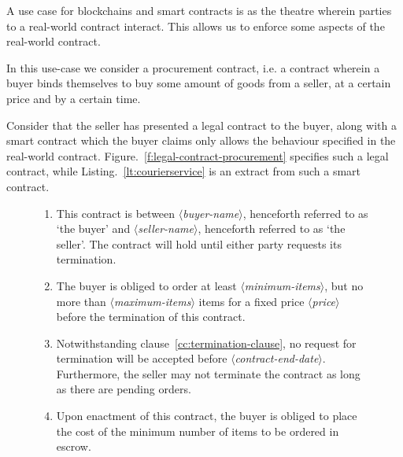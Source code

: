 \documentclass{article}
\newcommand{\placeholder}[1]{\mbox{$\langle$\textit{#1}$\rangle$}}
\begin{document}
   A use case for blockchains and smart contracts is as the theatre wherein parties to a real-world contract interact. This allows us to enforce some aspects of the real-world contract.
   
   In this use-case we consider a procurement contract, i.e. a contract wherein a buyer binds themselves to buy some amount of goods from a seller, at a certain price and by a certain time. 
   
   Consider that the seller has presented a legal contract to the buyer, along with a smart contract which the buyer claims only allows the behaviour specified in the real-world contract. Figure.~\ref{f:legal-contract-procurement} specifies such a legal contract, while Listing.~\ref{lt:courierservice} is an extract from such a smart contract.
   
   
   \begin{figure}[t]
   \setlength{\belowcaptionskip}{-20pt}
    \scriptsize %
    {\itshape
    \begin{enumerate}
     \item \label{cc:termination-clause} This contract is between \placeholder{buyer-name}, henceforth referred to as `the buyer' and \placeholder{seller-name}, henceforth referred to as `the seller'. The contract will hold until either party requests its termination.
     \item \label{cc:contract-parameters} The buyer is obliged to order at least \placeholder{minimum-items}, but no more than \placeholder{maximum-items} items for a fixed price \placeholder{price} before the termination of this contract. 
     \item \label{cc:escrow-payment-for-contract} Notwithstanding clause~\ref{cc:termination-clause}, no request for termination will be accepted before \placeholder{contract-end-date}. Furthermore, the seller may not terminate the contract as long as there are pending orders.
     \item Upon enactment of this contract, the buyer is obliged to place the cost of the minimum number of items to be ordered in escrow.

\end{enumerate}}
\end{figure}
\end{document}
